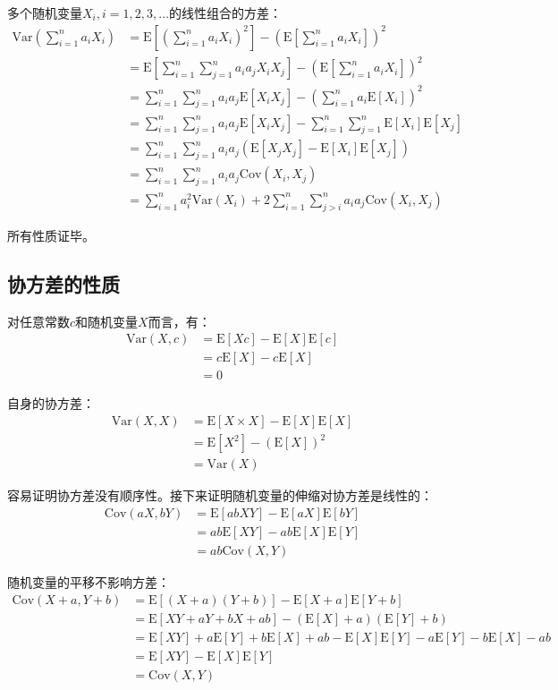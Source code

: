 \documentclass[UTF8]{ctexbook}
\begin{document}
多个随机变量$X_i,i=1,2,3,\dots$的线性组合的方差：
\begin{align*}
	\mathrm{Var}\left(\sum_{i=1}^na_iX_i\right)&=\mathrm E\left[\left(\sum_{i=1}^na_iX_i\right)^2\right]-\left(\mathrm E\left[\sum_{i=1}^na_iX_i\right]\right)^2 \\
	&=\mathrm E\left[\sum_{i=1}^n\sum_{j=1}^na_ia_jX_iX_j\right]-\left(\mathrm E\left[\sum_{i=1}^na_iX_i\right]\right)^2 \\
	&=\sum_{i=1}^n\sum_{j=1}^na_ia_j\mathrm E[X_iX_j]-\left(\sum_{i=1}^na_i\mathrm E[X_i]\right)^2 \\
	&=\sum_{i=1}^n\sum_{j=1}^na_ia_j\mathrm E[X_iX_j]-\sum_{i=1}^n\sum_{j=1}^n\mathrm E[X_i]\mathrm E[X_j] \\
	&=\sum_{i=1}^n\sum_{j=1}^na_ia_j(\mathrm E[X_jX_j]-\mathrm E[X_i]\mathrm E[X_j]) \\
	&=\sum_{i=1}^n\sum_{j=1}^na_ia_j\mathrm{Cov}(X_i,X_j) \\
	&=\sum_{i=1}^na_i^2\mathrm{Var}(X_i)+2\sum_{i=1}^n\sum_{j>i}^na_ia_j\mathrm{Cov}(X_i,X_j)
\end{align*}

所有性质证毕。
\subsection{协方差的性质}
\label{covariance-proof}
对任意常数$c$和随机变量$X$而言，有：
\begin{align*}
	\mathrm{Var}(X,c)&=\mathrm E[Xc]-\mathrm E[X]\mathrm E[c] \\
	&=c\mathrm E[X]-c\mathrm E[X] \\
	&=0
\end{align*}

自身的协方差：
\begin{align*}
	\mathrm{Var}(X,X)&=\mathrm E[X\times X]-\mathrm E[X]\mathrm E[X] \\
	&=\mathrm E[X^2]-(\mathrm E[X])^2 \\
	&=\mathrm{Var}(X)
\end{align*}

容易证明协方差没有顺序性。接下来证明随机变量的伸缩对协方差是线性的：
\begin{align*}
	\mathrm{Cov}(aX,bY)&=\mathrm E[abXY]-\mathrm E[aX]\mathrm E[bY] \\
	&=ab\mathrm E[XY]-ab\mathrm E[X]\mathrm E[Y] \\
	&=ab\mathrm{Cov}(X, Y)
\end{align*}

随机变量的平移不影响方差：
\begin{align*}
	\mathrm{Cov}(X+a,Y+b)&=\mathrm E[(X+a)(Y+b)]-\mathrm E[X+a]\mathrm E[Y+b] \\
	&=\mathrm E[XY+aY+bX+ab]-(\mathrm E[X]+a)(\mathrm E[Y]+b) \\
	&=\mathrm E[XY]+a\mathrm E[Y]+b\mathrm E[X]+ab-\mathrm E[X]\mathrm E[Y]-a\mathrm E[Y]-b\mathrm E[X]-ab \\
	&=\mathrm E[XY]-\mathrm E[X]\mathrm E[Y] \\
	&=\mathrm{Cov}(X, Y)
\end{align*}
\end{document}

